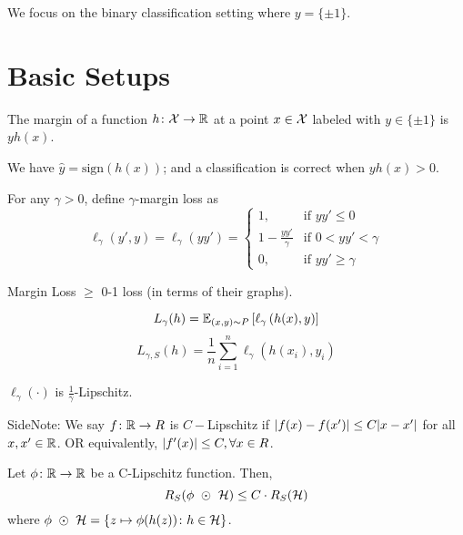 We focus on the binary classification setting where \(y = \{\pm 1\}\). 

\section{Basic Setups}

\begin{definition}[Margin]\label{def:margin}
    The margin of a function \(h \colon \mathcal{X} \to \mathbb{R}\) at a point \(x \in \mathcal{X}\) labeled 
    with \(y \in \{\pm 1\}\) is \(yh(x)\). 
\end{definition}

\begin{remark}
    We have \( \hat{y} = \text{sign}\left(h(x)\right)\); and a classification is correct when 
    \(y h(x) > 0\). 
\end{remark}

\begin{definition}\label{def:margin_loss}
    For any \(\gamma > 0\), define \(\gamma\)-margin loss as 
    \[
        \ell_\gamma (y', y) = \ell_\gamma(yy') = \begin{cases}
            1, &\text{if } yy' \leq 0 \\ 
            1 - \frac{yy'}{\gamma} &\text{if } 0 < yy' < \gamma \\ 
            0, &\text{if } yy' \geq \gamma 
        \end{cases}  
    \]
\end{definition}

\begin{remark}
    Margin Loss \(\geq\) 0-1 loss (in terms of their graphs). 
\end{remark}

\begin{definition}
    \[
        L_\gamma (h) = \mathbb{E}_{(x,y) \sim P} \left[ \ell_\gamma \left(h(x), y\right) \right] 
    \] 
    \[ 
        L_{\gamma, S} (h) = \frac{1}{n} \sum_{i=1}^n \ell_\gamma \left(h(x_i), y_i\right)  
    \]
\end{definition}

\begin{remark}
    \(\ell_\gamma (\cdot)\) is \(\frac{1}{\gamma}\)-Lipschitz. 
\end{remark}

SideNote: We say \(f \colon \mathbb{R} \to R\) is \(C-\)Lipschitz if \(\lvert f(x) - f(x') \rvert
\leq C\lvert x - x' \rvert\) for all \(x, x' \in \mathbb{R}\). OR equivalently, \(\lvert f'(x) \rvert \leq C,
\forall x \in R\). 

\begin{lemma}
    Let \(\phi \colon \mathbb{R} \to \mathbb{R}\) be a C-Lipschitz function. Then, 
    \[
        R_S (\phi \ \odot \ \Hcal) \leq C \cdot R_S(\Hcal)  
    \]
    where \(\phi \ \odot \ \mathcal{H} = \{z \mapsto \phi(h(z)) \colon h \in \mathcal{H}\}\).  
\end{lemma}

